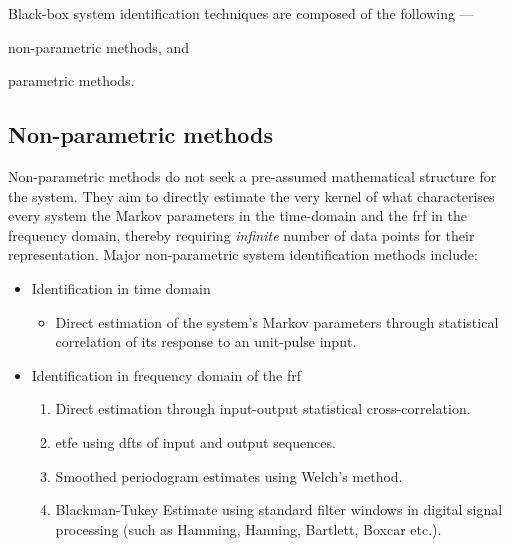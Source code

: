 
Black-box system identification techniques are composed of the following ---
\begin{enumerate*}[label=\emph{\alph*})]
     \item non-parametric methods, and
     \item parametric methods.
 \end{enumerate*}

\subsection{Non-parametric methods}
Non-parametric methods do not seek  a pre-assumed mathematical structure for the
system. They  aim to  directly estimate  the very  kernel of  what characterises
every system \viz{}  the Markov parameters in the time-domain  and the \gls{frf}
in the frequency domain, thereby requiring \emph{infinite} number of data points
for  their representation.  Major non-parametric  system identification  methods
include:
\begin{itemize}[topsep=0pt]
    \item Identification in time domain
        \begin{itemize}

            \item Direct  estimation of the system's  Markov parameters through
                statistical correlation of its response to an unit-pulse input.

        \end{itemize}
    \item Identification in frequency domain \ie{} of the \gls{frf}
        \begin{enumerate}

            \item   Direct   estimation    through   input-output   statistical
                cross-correlation.

            \item  \gls{etfe} using \glspl{dft} of input and output sequences.

            \item  Smoothed periodogram estimates using Welch's method.

            \item  Blackman-Tukey  Estimate   using  standard  filter
                windows  in digital  signal processing  (such as  Hamming, Hanning,
                Bartlett, Boxcar etc.).

        \end{enumerate}
\end{itemize}

